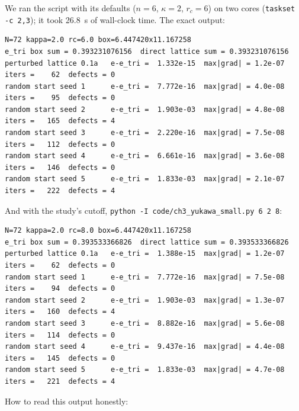 We ran the script with its defaults ($n=6$, $\kappa=2$, $r_c=6$) on two cores (\texttt{taskset -c 2,3}); it took
26.8~s of wall-clock time. The exact output:
\begin{lstlisting}[language={},title={python -I code/ch3\_yukawa\_small.py}]
N=72 kappa=2.0 rc=6.0 box=6.447420x11.167258
e_tri box sum = 0.393231076156  direct lattice sum = 0.393231076156
perturbed lattice 0.1a   e-e_tri =  1.332e-15  max|grad| = 1.2e-07  iters =    62  defects = 0
random start seed 1      e-e_tri =  7.772e-16  max|grad| = 4.0e-08  iters =    95  defects = 0
random start seed 2      e-e_tri =  1.903e-03  max|grad| = 4.8e-08  iters =   165  defects = 4
random start seed 3      e-e_tri =  2.220e-16  max|grad| = 7.5e-08  iters =   112  defects = 0
random start seed 4      e-e_tri =  6.661e-16  max|grad| = 3.6e-08  iters =   146  defects = 0
random start seed 5      e-e_tri =  1.833e-03  max|grad| = 2.1e-07  iters =   222  defects = 4
\end{lstlisting}
And with the study's cutoff, \texttt{python -I code/ch3\_yukawa\_small.py 6 2 8}:
\begin{lstlisting}[language={},title={python -I code/ch3\_yukawa\_small.py 6 2 8}]
N=72 kappa=2.0 rc=8.0 box=6.447420x11.167258
e_tri box sum = 0.393533366826  direct lattice sum = 0.393533366826
perturbed lattice 0.1a   e-e_tri =  1.388e-15  max|grad| = 1.2e-07  iters =    62  defects = 0
random start seed 1      e-e_tri =  7.772e-16  max|grad| = 7.5e-08  iters =    94  defects = 0
random start seed 2      e-e_tri =  1.903e-03  max|grad| = 1.3e-07  iters =   160  defects = 4
random start seed 3      e-e_tri =  8.882e-16  max|grad| = 5.6e-08  iters =   114  defects = 0
random start seed 4      e-e_tri =  9.437e-16  max|grad| = 4.4e-08  iters =   145  defects = 0
random start seed 5      e-e_tri =  1.833e-03  max|grad| = 4.7e-08  iters =   221  defects = 4
\end{lstlisting}
How to read this output honestly:
